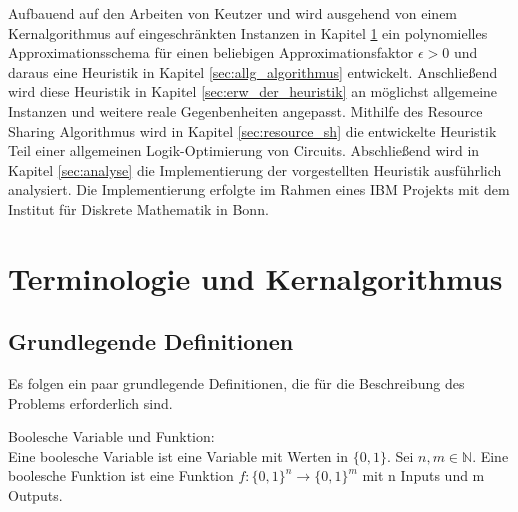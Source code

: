 \documentclass[11pt, a4paper, german]{article}
\begin{document}
Aufbauend auf den Arbeiten von Keutzer \cite{DAGON} und  \cite{Elbert} wird ausgehend von einem Kernalgorithmus auf eingeschränkten Instanzen in Kapitel \ref{sec:terminologie&grundl} ein polynomielles Approximationsschema für einen beliebigen Approximationsfaktor $\epsilon > 0$ und daraus eine Heuristik in Kapitel \ref{sec:allg_algorithmus} entwickelt. Anschließend wird diese Heuristik  in Kapitel \ref{sec:erw_der_heuristik} an möglichst allgemeine Instanzen und weitere reale Gegenbenheiten angepasst. Mithilfe des Resource Sharing Algorithmus wird in Kapitel \ref{sec:resource_sh} die entwickelte Heuristik Teil einer allgemeinen Logik-Optimierung von Circuits. Abschließend wird in Kapitel \ref{sec:analyse} die Implementierung der vorgestellten Heuristik ausführlich analysiert. Die Implementierung erfolgte im Rahmen eines IBM Projekts mit dem Institut für Diskrete Mathematik in Bonn.


\newpage

\section{Terminologie und Kernalgorithmus}
\label{sec:terminologie&grundl}
\subsection{Grundlegende Definitionen}
\label{subsec:grundlegende_definitionen}
Es folgen ein paar grundlegende Definitionen, die für die Beschreibung des Problems erforderlich sind.

\begin{definition}{Boolesche Variable und Funktion: } \\
Eine boolesche Variable ist eine Variable mit Werten in $ \{ 0 , 1 \} $.
Sei $ n, m \in \mathbb{N}$. Eine boolesche Funktion ist eine Funktion $ f : \{ 0 , 1 \}^n \rightarrow \{ 0 , 1 \}^m $ mit n Inputs und m Outputs. 
\end{definition}
\end{document}
